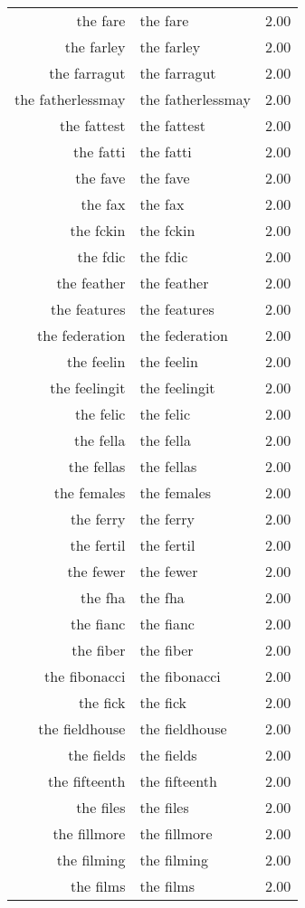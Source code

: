 \begin{table}[ht]
\begin{tabular}{rlr}
  the fare & the fare & 2.00 \\ 
  the farley & the farley & 2.00 \\ 
  the farragut & the farragut & 2.00 \\ 
  the fatherlessmay & the fatherlessmay & 2.00 \\ 
  the fattest & the fattest & 2.00 \\ 
  the fatti & the fatti & 2.00 \\ 
  the fave & the fave & 2.00 \\ 
  the fax & the fax & 2.00 \\ 
  the fckin & the fckin & 2.00 \\ 
  the fdic & the fdic & 2.00 \\ 
  the feather & the feather & 2.00 \\ 
  the features & the features & 2.00 \\ 
  the federation & the federation & 2.00 \\ 
  the feelin & the feelin & 2.00 \\ 
  the feelingit & the feelingit & 2.00 \\ 
  the felic & the felic & 2.00 \\ 
  the fella & the fella & 2.00 \\ 
  the fellas & the fellas & 2.00 \\ 
  the females & the females & 2.00 \\ 
  the ferry & the ferry & 2.00 \\ 
  the fertil & the fertil & 2.00 \\ 
  the fewer & the fewer & 2.00 \\ 
  the fha & the fha & 2.00 \\ 
  the fianc & the fianc & 2.00 \\ 
  the fiber & the fiber & 2.00 \\ 
  the fibonacci & the fibonacci & 2.00 \\ 
  the fick & the fick & 2.00 \\ 
  the fieldhouse & the fieldhouse & 2.00 \\ 
  the fields & the fields & 2.00 \\ 
  the fifteenth & the fifteenth & 2.00 \\ 
  the files & the files & 2.00 \\ 
  the fillmore & the fillmore & 2.00 \\ 
  the filming & the filming & 2.00 \\ 
  the films & the films & 2.00 \\ 

\end{tabular}
\end{table}
